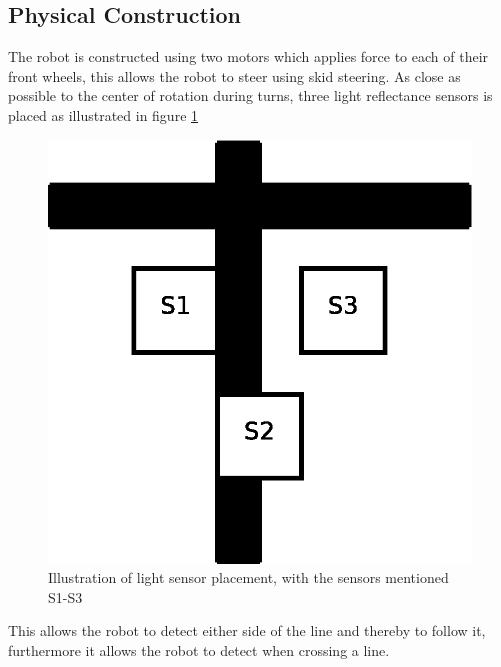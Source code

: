 \documentclass[draft, english, a4paper]{article}
\begin{document}
	\subsection{Physical Construction} %
	    \label{robot:physicalContruction}
	    The robot is constructed using two motors which applies force to
	    each of their front wheels, this allows the robot to steer using skid steering.
	    As close as possible to the center of rotation during turns, three light
	    reflectance sensors is placed as illustrated in figure \ref{fig:lightSensorPlacement}
	    \begin{figure}[htp]
            \centering
    	    \includegraphics[scale=0.45]{lightSensorPlacement}
	        \caption{Illustration of light sensor placement, with the sensors mentioned S1-S3}\label{fig:lightSensorPlacement}
        \end{figure}
	    This allows the robot to detect either side of the line and thereby to
	    follow it, furthermore it allows the robot to detect when crossing a 
	    line.
	      
\end{document}
